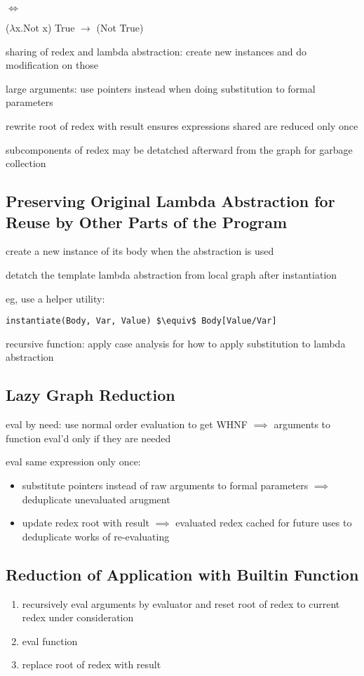 \documentclass[8pt]{extarticle}
\begin{document}
\begin{multicols*}{2}
\begin{tblr}[]{}
$\iff$

($\lambda$x.Not x) True $\rightarrow$ (Not True)

sharing of redex and lambda abstraction: create new instances and do modification on those

large arguments: use pointers instead when doing substitution to formal parameters

rewrite root of redex with result ensures expressions shared are reduced only once

subcomponents of redex may be detatched afterward from the graph for garbage collection

\subsection{Preserving Original Lambda Abstraction for Reuse by Other Parts of the Program}
create a new instance of its body when the abstraction is used

detatch the template lambda abstraction from local graph after instantiation

eg, use a helper utility:
\begin{lstlisting}
instantiate(Body, Var, Value) $\equiv$ Body[Value/Var]
\end{lstlisting}

recursive function: apply case analysis for how to apply substitution to lambda abstraction

\subsection{Lazy Graph Reduction}
eval by need: use normal order evaluation to get WHNF $\implies$ arguments to function eval'd only if they are needed

eval same expression only once:
\begin{itemize}
\item substitute pointers instead of raw arguments to formal parameters $\implies$ deduplicate unevaluated arugment
\item update redex root with result $\implies$ evaluated redex cached for future uses to deduplicate works of re-evaluating
\end{itemize}

\subsection{Reduction of Application with Builtin Function}
\begin{enumerate}
\item recursively eval arguments by evaluator and reset root of redex to current redex under consideration
\item eval function
\item replace root of redex with result
\end{enumerate}


\end{tblr}
\end{multicols*}
\end{document}
